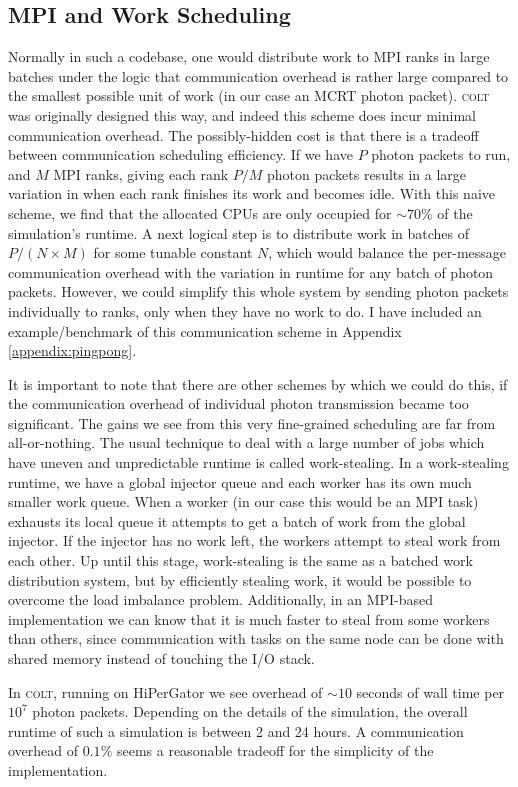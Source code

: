 \subsection{MPI and Work Scheduling}
Normally in such a codebase, one would distribute work to MPI ranks in large batches under the logic that communication overhead is rather large compared to the smallest possible unit of work (in our case an MCRT photon packet).
\textsc{colt} was originally designed this way, and indeed this scheme does incur minimal communication overhead.
The possibly-hidden cost is that there is a tradeoff between communication scheduling efficiency.
If we have $P$ photon packets to run, and $M$ MPI ranks, giving each rank $P/M$ photon packets results in a large variation in when each rank finishes its work and becomes idle.
With this naive scheme, we find that the allocated CPUs are only occupied for $\sim 70\%$ of the simulation's runtime.
A next logical step is to distribute work in batches of $P/(N\times M)$ for some tunable constant $N$, which would balance the per-message communication overhead with the variation in runtime for any batch of photon packets.
However, we could simplify this whole system by sending photon packets individually to ranks, only when they have no work to do.
I have included an example/benchmark of this communication scheme in Appendix \ref{appendix:pingpong}.

It is important to note that there are other schemes by which we could do this, if the communication overhead of individual photon transmission became too significant.
The gains we see from this very fine-grained scheduling are far from all-or-nothing.
The usual technique to deal with a large number of jobs which have uneven and unpredictable runtime is called work-stealing.
In a work-stealing runtime, we have a global injector queue and each worker has its own much smaller work queue.
When a worker (in our case this would be an MPI task) exhausts its local queue it attempts to get a batch of work from the global injector.
If the injector has no work left, the workers attempt to steal work from each other.
Up until this stage, work-stealing is the same as a batched work distribution system, but by efficiently stealing work, it would be possible to overcome the load imbalance problem.
Additionally, in an MPI-based implementation we can know that it is much faster to steal from some workers than others, since communication with tasks on the same node can be done with shared memory instead of touching the I/O stack.

In \textsc{colt}, running on HiPerGator we see overhead of $\sim 10$ seconds of wall time per $10^{7}$ photon packets.
Depending on the details of the simulation, the overall runtime of such a simulation is between 2 and 24 hours.
A communication overhead of $0.1\%$ seems a reasonable tradeoff for the simplicity of the implementation.
